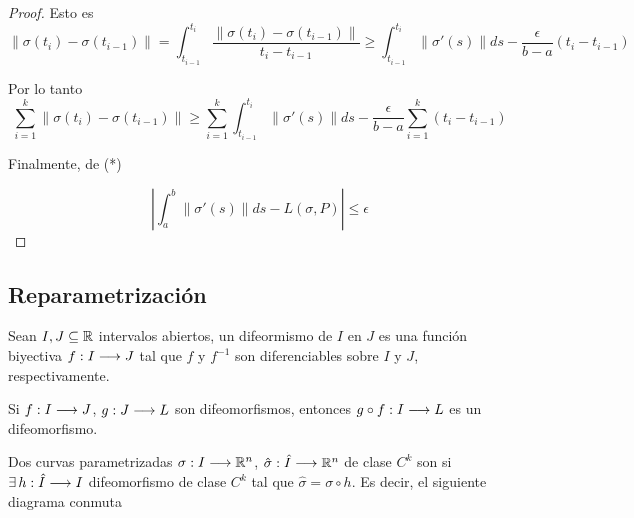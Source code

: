 \begin{proof}
	Esto es
	\[
		\left\| \sigma(t_i)-\sigma(t_{i-1}) \right\| = \int_{t_{i-1}}^{t_i} \frac{\left\| \sigma(t_i)-\sigma(t_{i-1}) \right\|}{t_i-t_{i-1}} \ge \int_{t_{i-1}}^{t_i} \left\| \sigma'(s) \right\| ds - \frac{\epsilon}{b-a} (t_i-t_{i-1})
	\]
	
	Por lo tanto
	\[ \sum_{i=1}^k  \left\| \sigma(t_i)-\sigma(t_{i-1}) \right\| \ge \sum_{i=1}^k \int_{t_{i-1}}^{t_i} \left\| \sigma'(s) \right\| ds - \frac{\epsilon}{b-a}  \sum_{i=1}^k (t_i-t_{i-1}) \]
	
	Finalmente, de (*)
	
	\[ \left| \int_{a}^{b} \left\| \sigma '(s) \right\| ds - L(\sigma, P) \right| \le \epsilon \]

\end{proof}

\subsection{Reparametrización}

\begin{dfn}
	Sean $I, J \subseteq \mathbb{R} $ intervalos abiertos, un difeormismo de $I$ en $J$ es una función biyectiva $f: I \longrightarrow J$ tal que $f$ y $f^{-1}$ son diferenciables sobre $I$ y $J$, respectivamente.
\end{dfn}

\begin{obs}
	Si $f: I \longrightarrow J$, $g: J \longrightarrow L$ son difeomorfismos, entonces $g \circ f: I \longrightarrow L$ es un difeomorfismo.
\end{obs}


\begin{dfn}
	Dos curvas parametrizadas $\sigma: I \longrightarrow \mathbb{R}^n$, $\hat{\sigma}: \hat{I} \longrightarrow \mathbb{R}^n$ de clase $C^k$ son  si $\exists \, h: \hat{I} \longrightarrow I$ difeomorfismo de clase $C^k$ tal que $\hat{\sigma}=\sigma\circ h$. Es decir, el siguiente diagrama conmuta
\end{dfn}
























